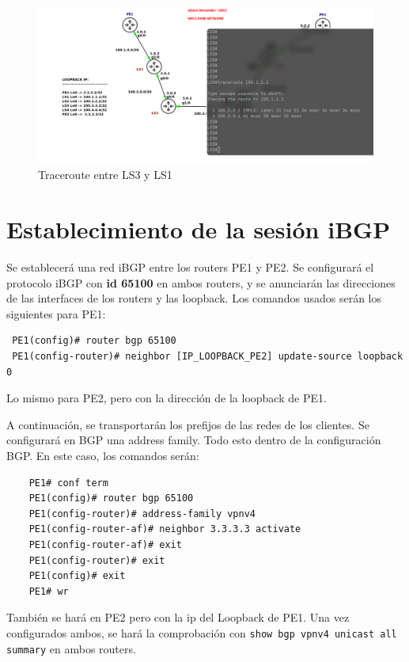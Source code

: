 \documentclass{article}
\begin{document}
\begin{figure}[h]
    \centering
    \includegraphics[width=1\textwidth]{src/tracerouteLS3.png}
    \caption{Traceroute entre LS3 y LS1}
\end{figure}


\newpage

\section{Establecimiento de la sesión iBGP}

Se establecerá una red iBGP entre los routers PE1 y PE2. Se configurará el protocolo iBGP con \textbf{id 65100} en ambos routers, y se anunciarán las direcciones de las interfaces de los routers y las loopback. Los comandos usados serán los siguientes para PE1:

\begin{verbatim}
 PE1(config)# router bgp 65100
 PE1(config-router)# neighbor [IP_LOOPBACK_PE2] update-source loopback 0
\end{verbatim}

Lo mismo para PE2, pero con la dirección de la loopback de PE1.

A continuación, se transportarán los prefijos de las redes de los clientes. Se configurará en BGP una address family. Todo esto dentro de la configuración BGP. En este caso, los comandos serán:

\begin{verbatim}
    PE1# conf term
    PE1(config)# router bgp 65100
    PE1(config-router)# address-family vpnv4
    PE1(config-router-af)# neighbor 3.3.3.3 activate
    PE1(config-router-af)# exit
    PE1(config-router)# exit
    PE1(config)# exit
    PE1# wr
\end{verbatim}

También se hará en PE2 pero con la ip del Loopback de PE1. Una vez configurados ambos, se hará la comprobación con \texttt{show bgp vpnv4 unicast all summary} en ambos routers.
\end{document}

